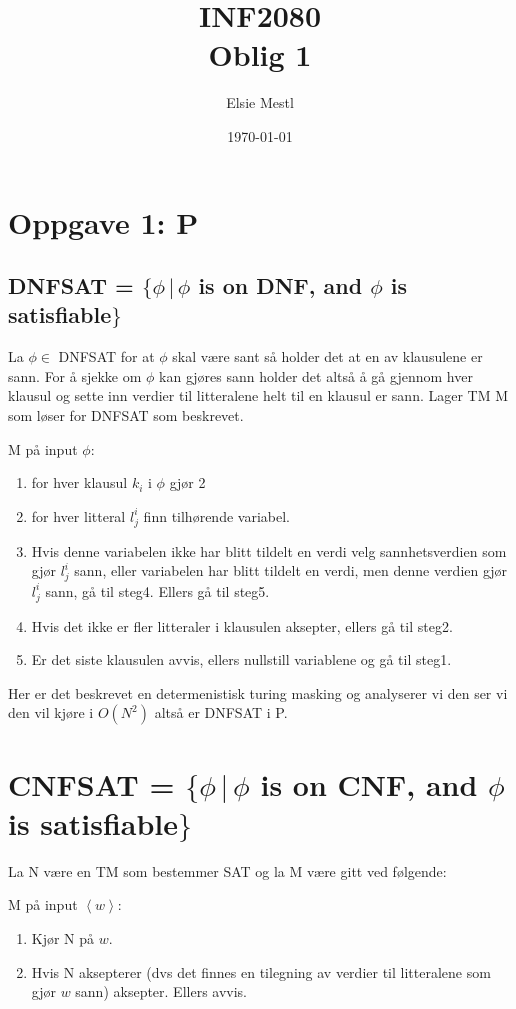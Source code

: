 \documentclass{article}
\title{INF2080\\Oblig 1}
\date{\today}
\author{Elsie Mestl}
\begin{document}
\maketitle



\section{Oppgave 1: P}
\subsection{DNFSAT = $\{\phi \, |  \, \phi $ is on DNF, and $\phi$ is satisfiable$\}$}

La $\phi \in$ DNFSAT for at $\phi$ skal være sant så holder det at en av klausulene er sann. For å sjekke om $\phi$ kan gjøres sann holder det altså å gå gjennom hver klausul og sette inn verdier til litteralene helt til en klausul er sann. Lager TM M som løser for DNFSAT som beskrevet.

M på input $\phi$:
\begin{enumerate}
\item for hver klausul $k_i$ i $\phi$ gjør 2
\item for hver litteral $l_j^i$ finn tilhørende variabel.
\item Hvis denne variabelen ikke har blitt tildelt en verdi velg sannhetsverdien som gjør  $l_j^i$ sann, eller variabelen har blitt tildelt en verdi, men denne verdien gjør $l_j^i$ sann, gå til steg4. Ellers gå til steg5.
\item Hvis det ikke er fler litteraler i klausulen aksepter, ellers gå til steg2.
\item Er det siste klausulen avvis, ellers nullstill variablene og gå til steg1. 
\end{enumerate}

Her er det beskrevet en determenistisk turing masking og analyserer vi den ser vi den vil kjøre i $O(N^2)$ altså er DNFSAT i P. 



\section{CNFSAT = $\{\phi \, |  \, \phi $ is on CNF, and $\phi$ is satisfiable$\}$}

La N være en TM som bestemmer SAT og la  M være gitt ved følgende:

M på input $\left<w\right>$:
\begin{enumerate}
\item Kjør N på $w$.
\item Hvis N aksepterer (dvs det finnes en tilegning av verdier til litteralene som gjør $w$ sann) aksepter. Ellers avvis.
\end{enumerate}
\end{document}
